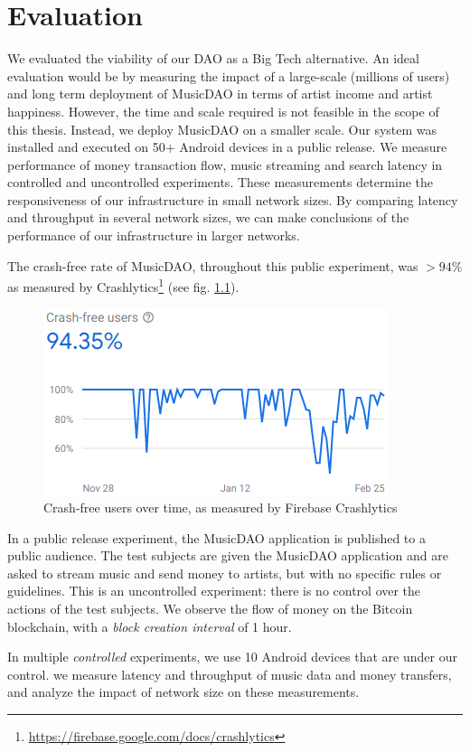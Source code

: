 \chapter{\label{chap:evaluation}Evaluation}
We evaluated the viability of our DAO as a Big Tech alternative. An ideal evaluation would be by measuring the impact of a large-scale (millions of users) and long term deployment of MusicDAO in terms of artist income and artist happiness. However, the time and scale required is not feasible in the scope of this thesis. Instead, we deploy MusicDAO on a smaller scale. Our system was installed and executed on 50+ Android devices in a public release. We measure performance of money transaction flow, music streaming and search latency in controlled and uncontrolled experiments. These measurements determine the responsiveness of our infrastructure in small network sizes. By comparing latency and throughput in several network sizes, we can make conclusions of the performance of our infrastructure in larger networks.

The crash-free rate of MusicDAO, throughout this public experiment, was $>94\%$ as measured by Crashlytics\footnote{\url{https://firebase.google.com/docs/crashlytics}} (see fig. \ref{fig:crash-free-users}). 

\begin{figure}
    \centering
    \includegraphics[width=0.4\linewidth]{evaluation/crash-free-users-90-days.png}
    \caption{Crash-free users over time, as measured by Firebase Crashlytics}
    \label{fig:crash-free-users}
\end{figure}
In a public release experiment, the MusicDAO application is published to a public audience. The test subjects are given the MusicDAO application and are asked to stream music and send money to artists, but with no specific rules or guidelines. This is an uncontrolled experiment: there is no control over the actions of the test subjects. We observe the flow of money on the Bitcoin blockchain, with a \textit{block creation interval} of 1 hour. 

In multiple \textit{controlled} experiments, we use 10 Android devices that are under our control. we measure latency and throughput of music data and money transfers, and analyze the impact of network size on these measurements.

